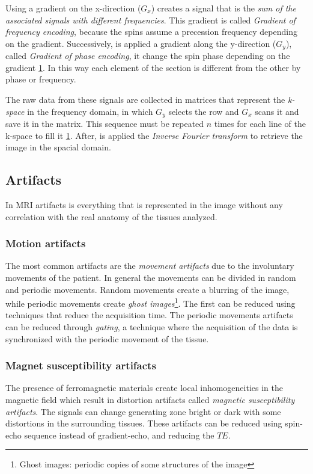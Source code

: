  \noindent Using a gradient on the x-direction ($G_x$) creates a signal that is the \emph{sum of the associated signals with different frequencies}. This gradient is called \emph{Gradient of frequency encoding}, because the spins assume a precession frequency depending on the gradient. Successively, is applied a gradient along the y-direction ($G_y$), called \emph{Gradient of phase encoding}, it change the spin phase depending on the gradient \ref{fig:gradXY}. In this way each element of the section is different from the other by phase or frequency.

 The raw data from these signals are collected in matrices that represent the \emph{k-space} in the frequency domain, in which $G_y$ selects the row and $G_x$ scans it and save it in the matrix.
 This sequence must be repeated $n$ times for each line of the k-space to fill it \ref{fig:gradXY}.
 After, is applied the \emph{Inverse Fourier transform} to retrieve the image in the spacial domain.

 \begin{figure}[h]
    \centering
    \caption{}
    \label{fig:gradXY}
 \end{figure}

 \subsection{Artifacts}
 In MRI artifacts is everything that is represented in the image without any correlation with the real anatomy of the tissues analyzed.
  \subsubsection*{Motion artifacts}
  The most common artifacts are the \emph{movement artifacts} due to the involuntary movements of the patient. In general the movements can be divided in random and periodic movements. Random movements create a blurring of the image, while periodic movements create \emph{ghost images}\footnote{Ghost images: periodic copies of some structures of the image}. The first can be reduced using techniques that reduce the acquisition time. The periodic movements artifacts can be reduced through \emph{gating}, a technique where the acquisition of the data is synchronized with the periodic movement of the tissue.
  \subsubsection*{Magnet susceptibility artifacts}
  The presence of ferromagnetic materials create local inhomogeneities in the magnetic field which result in distortion artifacts called \emph{magnetic susceptibility artifacts}. The signals can change generating zone bright or dark with some distortions in the surrounding tissues. These artifacts can be reduced using spin-echo sequence instead of gradient-echo, and reducing the $TE$.
